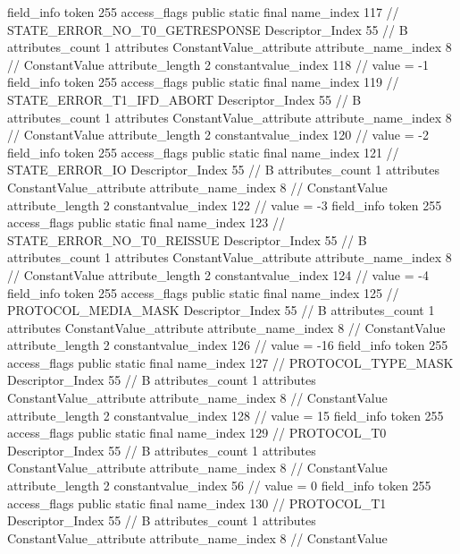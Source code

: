 {{{{			field_info {
				token	255
				access_flags	public static final
				name_index	117		// STATE_ERROR_NO_T0_GETRESPONSE
				Descriptor_Index	55		// B
				attributes_count	1
				attributes {
				ConstantValue_attribute {
					attribute_name_index	8		// ConstantValue
					attribute_length	2
					constantvalue_index	118		// value = -1
				}
				}
			}
			field_info {
				token	255
				access_flags	public static final
				name_index	119		// STATE_ERROR_T1_IFD_ABORT
				Descriptor_Index	55		// B
				attributes_count	1
				attributes {
				ConstantValue_attribute {
					attribute_name_index	8		// ConstantValue
					attribute_length	2
					constantvalue_index	120		// value = -2
				}
				}
			}
			field_info {
				token	255
				access_flags	public static final
				name_index	121		// STATE_ERROR_IO
				Descriptor_Index	55		// B
				attributes_count	1
				attributes {
				ConstantValue_attribute {
					attribute_name_index	8		// ConstantValue
					attribute_length	2
					constantvalue_index	122		// value = -3
				}
				}
			}
			field_info {
				token	255
				access_flags	public static final
				name_index	123		// STATE_ERROR_NO_T0_REISSUE
				Descriptor_Index	55		// B
				attributes_count	1
				attributes {
				ConstantValue_attribute {
					attribute_name_index	8		// ConstantValue
					attribute_length	2
					constantvalue_index	124		// value = -4
				}
				}
			}
			field_info {
				token	255
				access_flags	public static final
				name_index	125		// PROTOCOL_MEDIA_MASK
				Descriptor_Index	55		// B
				attributes_count	1
				attributes {
				ConstantValue_attribute {
					attribute_name_index	8		// ConstantValue
					attribute_length	2
					constantvalue_index	126		// value = -16
				}
				}
			}
			field_info {
				token	255
				access_flags	public static final
				name_index	127		// PROTOCOL_TYPE_MASK
				Descriptor_Index	55		// B
				attributes_count	1
				attributes {
				ConstantValue_attribute {
					attribute_name_index	8		// ConstantValue
					attribute_length	2
					constantvalue_index	128		// value = 15
				}
				}
			}
			field_info {
				token	255
				access_flags	public static final
				name_index	129		// PROTOCOL_T0
				Descriptor_Index	55		// B
				attributes_count	1
				attributes {
				ConstantValue_attribute {
					attribute_name_index	8		// ConstantValue
					attribute_length	2
					constantvalue_index	56		// value = 0
				}
				}
			}
			field_info {
				token	255
				access_flags	public static final
				name_index	130		// PROTOCOL_T1
				Descriptor_Index	55		// B
				attributes_count	1
				attributes {
				ConstantValue_attribute {
					attribute_name_index	8		// ConstantValue
}}}}}}}
